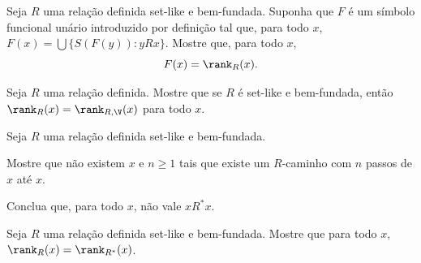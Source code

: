 \begin{exercise}[$\ZFmP$]\label{ex:rankBemDefinido}
    Seja $R$ uma relação definida set-like e bem-fundada.
    Suponha que $F$ é um símbolo funcional unário introduzido por definição tal que, para todo $x$, $F(x)=\bigcup\{S(F(y)): y R x\}$.
    Mostre que, para todo $x$,
    \[
        F(x)=\rank_R(x).
    \]
\end{exercise}

\begin{exercise}[$\ZFmP$]\label{exr:relacaoBemFundadaEmVranks}
    Seja $R$ uma relação definida.
    Mostre que se $R$ é set-like e bem-fundada, então $\rank_R(x)=\rank_{R, \V}(x)$ para todo $x$.
\end{exercise}

\begin{exercise}[$\ZFmP$]\label{ex:semCiclosBemFundada}
    Seja $R$ uma relação definida set-like e bem-fundada.

    Mostre que não existem $x$ e $n\geq 1$ tais que existe um $R$-caminho com $n$ passos de $x$ até $x$.

    Conclua que, para todo $x$, não vale $x R^* x$.
\end{exercise}

\begin{exercise}[$\ZFmP$]\label{ex:rankCaminho}
    Seja $R$ uma relação definida set-like e bem-fundada.
    Mostre que para todo $x$, $\rank_R(x)=\rank_{R^*}(x)$.
\end{exercise}